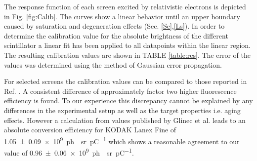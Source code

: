 \documentclass[%
reprint,
amsmath,
amssymb,
aip,
rsi, 
numerical,
floatfix,
]{revtex4-1}
\newcommand{\myCite}[1]{\textcolor{blue}{\cite{#1}}}
\newcommand{\myOnlineCite}[1]{\textcolor{blue}{\onlinecite{#1}}}
\begin{document}


The response function of each screen excited by relativistic electrons is depicted in Fig. \ref{fig:Calib}.
The curves show a linear behavior until an upper boundary caused by saturation and degeneration effects (Sec. \ref{Se},\ref{Ls}).  
In order to determine the calibration value for the absolute brightness of the different scintillator a linear fit has been applied to all datapoints within the linear region.
The resulting calibration values are shown in TABLE \ref{table:res}. 
The error of the values was determined using the method of Gaussian error propagation.

For selected screens the calibration values can be compared to those reported in Ref. \myOnlineCite{Buck2010}.
A consistent difference of approximately factor two higher fluorescence efficiency is found.
To our experience this discrepancy cannot be explained by any differences in the experimental setup as well as the target properties i.e. aging effects.
However a calculation from values published by Glinec et al.\myCite{Glinec2006} leads to an absolute conversion efficiency for KODAK Lanex Fine of \SI[separate-uncertainty = true]{1.05(9)e9}{ph \per \steradian \per \pico \coulomb} which shows a reasonable agreement to our value of \SI[separate-uncertainty = true]{0.96(6)e9}{ph \per \steradian \per \pico \coulomb}. 
   
\end{document}

